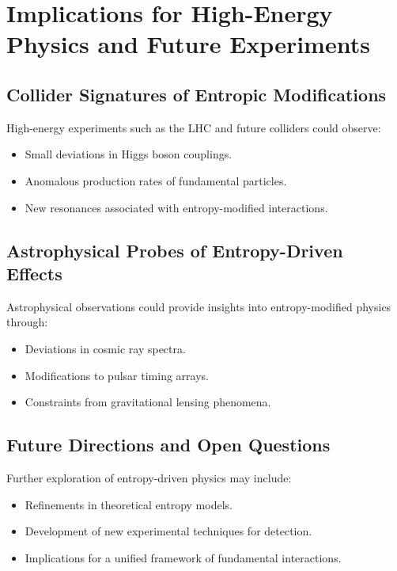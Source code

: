 \documentclass{article}
\begin{document}
\section{Implications for High-Energy Physics and Future Experiments}

\subsection{Collider Signatures of Entropic Modifications}
High-energy experiments such as the LHC and future colliders could observe:
\begin{itemize}
    \item Small deviations in Higgs boson couplings.
    \item Anomalous production rates of fundamental particles.
    \item New resonances associated with entropy-modified interactions.
\end{itemize}

\subsection{Astrophysical Probes of Entropy-Driven Effects}
Astrophysical observations could provide insights into entropy-modified physics through:
\begin{itemize}
    \item Deviations in cosmic ray spectra.
    \item Modifications to pulsar timing arrays.
    \item Constraints from gravitational lensing phenomena.
\end{itemize}

\subsection{Future Directions and Open Questions}
Further exploration of entropy-driven physics may include:
\begin{itemize}
    \item Refinements in theoretical entropy models.
    \item Development of new experimental techniques for detection.
    \item Implications for a unified framework of fundamental interactions.
\end{itemize}
\end{document}
